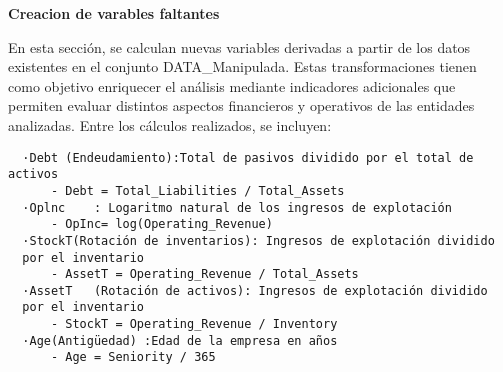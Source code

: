 \documentclass[
]{article}
\begin{document}
\textbf{Creacion de varables faltantes}

En esta sección, se calculan nuevas variables derivadas a partir de los
datos existentes en el conjunto DATA\_Manipulada. Estas transformaciones
tienen como objetivo enriquecer el análisis mediante indicadores
adicionales que permiten evaluar distintos aspectos financieros y
operativos de las entidades analizadas. Entre los cálculos realizados,
se incluyen:

\begin{verbatim}
  ·Debt (Endeudamiento):Total de pasivos dividido por el total de activos 
      - Debt = Total_Liabilities / Total_Assets
  ·Oplnc    : Logaritmo natural de los ingresos de explotación 
      - OpInc= log(Operating_Revenue)
  ·StockT(Rotación de inventarios): Ingresos de explotación dividido 
  por el inventario
      - AssetT = Operating_Revenue / Total_Assets 
  ·AssetT   (Rotación de activos): Ingresos de explotación dividido
  por el inventario
      - StockT = Operating_Revenue / Inventory
  ·Age(Antigüedad) :Edad de la empresa en años
      - Age = Seniority / 365 
\end{verbatim}
\end{document}

